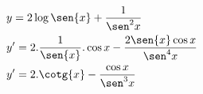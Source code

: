 \begin{ex}
\begin{align}
&y=2\log{\sen{x}}+\frac{1}{\sen^2{x}}\nonumber\\
&y'=2.\frac{1}{\sen{x}}.\cos{x}-\frac{2\sen{x}\cos{x}}{\sen^4{x}}\nonumber\\
&y'=2.\cotg{x}-\frac{\cos{x}}{\sen^3{x}}\nonumber
\end{align}
\end{ex}